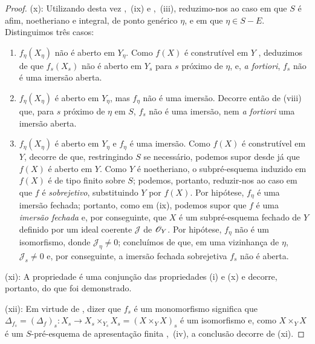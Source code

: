 \begin{proof}
(x): Utilizando desta vez ,~(ix) e ,~(iii), reduzimo-nos ao caso em que $S$ é afim, noetheriano e integral, de ponto genérico $\eta$, e em que $\eta\in S-E$.
Distinguimos três casos:
\begin{enumerate}[label=\upshape{$\arabic{enumi}^\circ$}]
  \item $f_\eta(X_\eta)$ não é aberto em $Y_\eta$.
  Como $f(X)$ é construtível em $Y$ , deduzimos de  que $f_s(X_s)$ não é aberto em $Y_s$ para $s$ próximo de $\eta$, e, \emph{a fortiori}, $f_s$ não é uma imersão aberta.

  \item $f_\eta(X_\eta)$ é aberto em $Y_\eta$, mas $f_\eta$ não é uma imersão.
  Decorre então de (viii) que, para $s$ próximo de $\eta$ em $S$, $f_s$ não é uma imersão, nem \emph{a fortiori} uma imersão aberta.

  \item $f_\eta(X_\eta)$ é aberto em $Y_\eta$ e $f_\eta$ é uma imersão.
  Como $f(X)$ é construtível em $Y$, decorre de  que, restringindo $S$ se necessário, podemos supor desde já que $f(X)$ é aberto em $Y$.
  Como $Y$ é noetheriano, o subpré-esquema induzido em $f(X)$ é de tipo finito sobre $S$; podemos, portanto, reduzir-nos ao caso em que $f$ é \emph{sobrejetivo}, substituindo $Y$ por $f(X)$.
  Por hipótese, $f_\eta$ é uma imersão fechada; portanto, como em (ix), podemos supor que $f$ é uma \emph{imersão fechada} e, por conseguinte, que $X$ é um subpré-esquema fechado de $Y$ definido por um ideal coerente $\mathscr{J}$ de $\mathscr{O}_Y$.
  Por hipótese, $f_\eta$ não é um isomorfismo, donde $\mathscr{J}_\eta\neq 0$; concluímos de  que, em uma vizinhança de $\eta$, $\mathscr{J}_s\neq 0$ e, por conseguinte, a imersão fechada sobrejetiva $f_s$ não é aberta.
\end{enumerate}

(xi): A propriedade é uma conjunção das propriedades (i) e (x) e decorre, portanto, do que foi demonstrado.

(xii): Em virtude de , dizer que $f_s$ é um monomorfismo significa que $\Delta_{f_s}=(\Delta_f)_s:X_s\to X_s\times_{Y_s}X_s=(X\times_Y X)_s$ é um isomorfismo e, como $X\times_Y X$ é um $S$-pré-esquema de apresentação finita ,~(iv), a conclusão decorre de (xi).
\end{proof}

